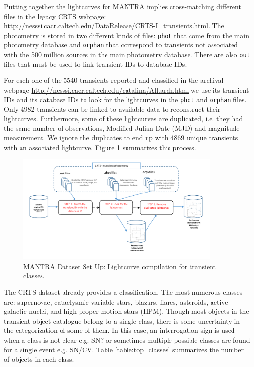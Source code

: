 \documentclass[twocolumn]{aastex62}
\begin{document}
Putting together the lightcurves for MANTRA implies
cross-matching different files in the legacy CRTS webpage:
\url{http://nesssi.cacr.caltech.edu/DataRelease/CRTS-I_transients.html}. 
The photometry is stored in two different kinds of files: \verb"phot"
that come from the main photometry database and \verb"orphan" that
correspond to transients not associated with the 500 million sources
in the main photometry database.
There are also \verb"out" files that must be used to link transient
IDs to database IDs.


For each one of the 5540 transients reported and classified in the
archival webpage \url{http://nesssi.cacr.caltech.edu/catalina/All.arch.html} we use its
transient IDs and its database IDs to look for the lightcurves in the
\texttt{phot} and \texttt{orphan} files. 
Only 4982 transients can be linked to available data to reconstruct
their lightcurves. 
Furthermore, some of these lightcurves are duplicated, i.e. they had
the same number of observations, Modified Julian Date (MJD) and magnitude measurement. 
We ignore the duplicates to end up with 4869 unique transients with an 
associated lightcurve. Figure \ref{fig:transients} summarizes this process. 

\begin{figure}
\begin{center}
  \includegraphics[width=0.9\textwidth]{Transients.pdf}
\end{center}
  \caption{MANTRA Dataset Set Up: Lightcurve compilation for transient classes.}
  \label{fig:transients}
\end{figure} 

The CRTS dataset already provides a classification. 
The most numerous classes are: supernovae,
cataclysmic variable stars, blazars, flares, asteroids, active
galactic nuclei, and high-proper-motion stars (HPM). 
Though most objects in the transient object catalogue belong to a single class, 
there is some uncertainty in the categorization of some of them.  
In this case, an interrogation sign is used when a class is not clear 
e.g. SN? or sometimes multiple possible classes are found for a single 
event e.g. SN/CV. 
Table \ref{table:top_classes} summarizes the number of objects in each class. 
\end{document}
